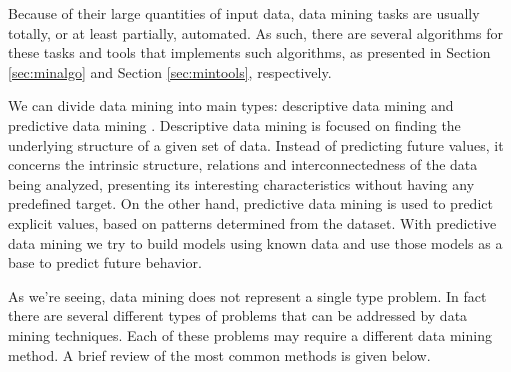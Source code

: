 Because of their large quantities of input data, data mining tasks are usually
totally, or at least partially, automated. As such, there are several algorithms
for these tasks and tools that implements such algorithms, as presented in
Section \ref{sec:minalgo} and Section \ref{sec:mintools}, respectively.

We can divide data mining into main types: descriptive data mining and
predictive data mining \cite{Fayyad1996}. Descriptive data mining is focused on
finding the underlying structure of a given set of data. Instead of predicting
future values, it concerns the intrinsic structure, relations and
interconnectedness of the data being analyzed, presenting its interesting
characteristics without having any predefined target. On the other hand,
predictive data mining is used to predict explicit values, based on patterns
determined from the dataset. With predictive data mining we try to build models
using known data and use those models as a base to predict future behavior.

As we're seeing, data mining does not represent a single type problem. In fact
there are several different types of problems that can be addressed by data
mining techniques. Each of these problems may require a different data mining
method. A brief review of the most common methods is given below.

